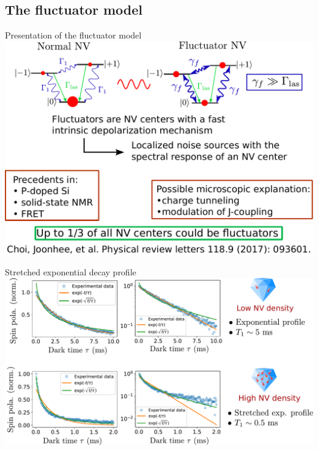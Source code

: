 \documentclass{beamer}
\begin{document}
\subsection{The fluctuator model}
\begin{frame}{Presentation of the fluctuator model}
\centering
\includegraphics[width=\textwidth,height=0.8\textheight,keepaspectratio]{Slide_fluct_intro}
\end{frame}

\begin{frame}{Stretched exponential decay profile}
\centering
\includegraphics[width=\textwidth,height=0.85\textheight,keepaspectratio]{Slide_T1_exp_stretch}
\end{frame}
\end{document}
